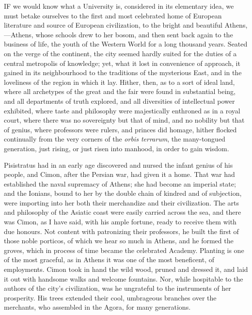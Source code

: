 
IF we would know what a University is,
considered in its elementary idea, we must betake ourselves to the
first and most celebrated home of European literature and source of
European civilization, to the bright and beautiful Athens,—Athens,
whose schools drew to her bosom, and then sent back again to the
business of life, the youth of the Western World for a long thousand
years. Seated on the verge of the continent, the city seemed hardly
suited for the duties of a central metropolis of knowledge; yet, what
it lost in convenience of approach, it gained in its neighbourhood to
the traditions of the mysterious East, and in the loveliness of the
region in which it lay. Hither, then, as to a sort of ideal land,
where all archetypes of the great and the fair were found in
substantial being, and all departments of truth explored, and all
diversities of intellectual power exhibited, where taste and
philosophy were majestically enthroned as in a royal court, where
there was no sovereignty but that of mind, and no nobility but that of
genius, where professors were rulers, and princes did homage, hither
flocked continually from the very corners of the \emph{orbis terrarum},
the many-tongued generation, just rising, or just risen into manhood,
in order to gain wisdom.

Pisistratus had in an early age discovered and nursed the infant
genius of his people, and Cimon, after the Persian war, had given
it a home. That war had established the naval supremacy of Athens; she
had become an imperial state; and the Ionians, bound to her by the
double chain of kindred and of subjection, were importing into her
both their merchandize and their civilization. The arts and philosophy
of the Asiatic coast were easily carried across the sea, and there was
Cimon, as I have said, with his ample fortune, ready to receive them
with due honours. Not content with patronizing their professors, he
built the first of those noble porticos, of which we hear so much in
Athens, and he formed the groves, which in process of time became the
celebrated Academy. Planting is one of the most graceful, as in Athens
it was one of the most beneficent, of employments. Cimon took in hand
the wild wood, pruned and dressed it, and laid it out with handsome
walks and welcome fountains. Nor, while hospitable to the authors of
the city's civilization, was he ungrateful to the instruments of her
prosperity. His trees extended their cool, umbrageous branches over
the merchants, who assembled in the Agora, for many generations.

